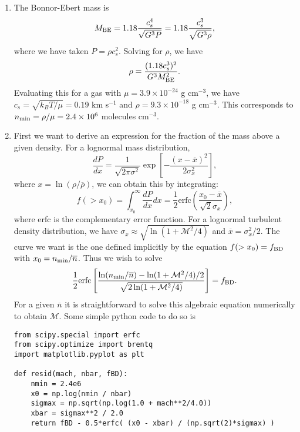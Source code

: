 \begin{enumerate}
\begin{enumerate}
\item The Bonnor-Ebert mass is
\begin{displaymath}
M_{\rm BE} = 1.18 \frac{c_s^4}{\sqrt{G^3 P}} = 1.18\frac{c_s^3}{\sqrt{G^3 \rho}},
\end{displaymath}
where we have taken $P = \rho c_s^2$. Solving for $\rho$, we have
\begin{displaymath}
\rho = \frac{(1.18 c_s^3)^2}{G^3 M_{\rm BE}^2}.
\end{displaymath}
Evaluating this for a gas with $\mu=3.9\times 10^{-24}$ g cm$^{-3}$, we have $c_s = \sqrt{k_B T/\mu} = 0.19$ km s$^{-1}$ and $\rho = 9.3\times 10^{-18}$ g cm$^{-3}$. This corresponds to $n_{\rm min} = \rho/\mu =2.4\times 10^6$ molecules cm$^{-3}$.

\item First we want to derive an expression for the fraction of the mass above a given density. For a lognormal mass distribution,
\begin{displaymath}
\frac{dP}{dx} = \frac{1}{\sqrt{2\pi \sigma^2}} \exp\left[-\frac{\left(x-\overline{x}\right)^2}{2\sigma_x^2}\right],
\end{displaymath}
where $x = \ln(\rho/\overline{\rho})$, we can obtain this by integrating:
\begin{displaymath}
f(>x_0) = \int_{x_0}^\infty \frac{dP}{dx} dx = \frac{1}{2} \mbox{erfc}\left(\frac{x_0-\overline{x}}{\sqrt{2}\sigma_x}\right),
\end{displaymath}
where erfc is the complementary error function. For a lognormal turbulent density distribution, we have $\sigma_x \approx \sqrt{\ln(1+\mathcal{M}^2/4)}$ and $\overline{x} = \sigma_x^2/2$. The curve we want is the one defined implicitly by the equation $f(>x_0) = f_{\rm BD}$ with $x_0 = n_{\rm min}/\overline{n}$. Thus we wish to solve
\begin{displaymath}
\frac{1}{2} \mbox{erfc}\left[\frac{\ln (n_{\rm min}/\overline{n}) - \ln(1+\mathcal{M}^2/4)/2}{\sqrt{2\ln(1+\mathcal{M}^2/4)}}\right] = f_{\rm BD}.
\end{displaymath}
For a given $\overline{n}$ it is straightforward to solve this algebraic equation numerically to obtain $\mathcal{M}$. Some simple python code to do so is
\begin{verbatim}
from scipy.special import erfc
from scipy.optimize import brentq
import matplotlib.pyplot as plt

def resid(mach, nbar, fBD):
    nmin = 2.4e6
    x0 = np.log(nmin / nbar)
    sigmax = np.sqrt(np.log(1.0 + mach**2/4.0))
    xbar = sigmax**2 / 2.0
    return fBD - 0.5*erfc( (x0 - xbar) / (np.sqrt(2)*sigmax) )


\end{verbatim}
\end{enumerate}
\end{enumerate}
